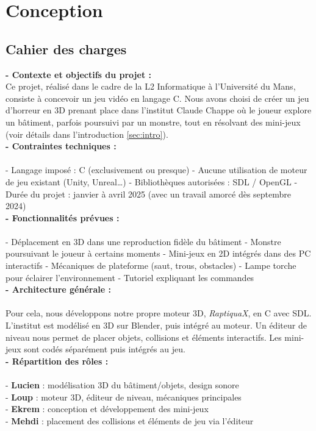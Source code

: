 \newpage
\section{Conception}

\subsection{Cahier des charges}

\textbf{- Contexte et objectifs du projet :}\\

Ce projet, réalisé dans le cadre de la L2 Informatique à l’Université du Mans,
consiste à concevoir un jeu vidéo en langage C. Nous avons choisi de créer un jeu
d’horreur en 3D prenant place dans l’institut Claude Chappe où le joueur explore un
bâtiment, parfois poursuivi par un monstre, tout en résolvant des mini-jeux (voir
détails dans l'introduction \ref{sec:intro}).\\

\textbf{- Contraintes techniques :}\\\\
- Langage imposé : C (exclusivement ou presque)  
- Aucune utilisation de moteur de jeu existant (Unity, Unreal…)  
- Bibliothèques autorisées : SDL / OpenGL  
- Durée du projet : janvier à avril 2025 (avec un travail amorcé dès septembre 2024)\\

\textbf{- Fonctionnalités prévues :}\\\\
- Déplacement en 3D dans une reproduction fidèle du bâtiment  
- Monstre poursuivant le joueur à certains moments  
- Mini-jeux en 2D intégrés dans des PC interactifs  
- Mécaniques de plateforme (saut, trous, obstacles)  
- Lampe torche pour éclairer l’environnement  
- Tutoriel expliquant les commandes\\

\textbf{- Architecture générale :}\\\\
Pour cela, nous développons notre propre moteur 3D, \textit{RaptiquaX}, en C avec SDL.
L’institut est modélisé en 3D sur Blender, puis intégré au moteur. Un éditeur de niveau
nous permet de placer objets, collisions et éléments interactifs. Les mini-jeux sont
codés séparément puis intégrés au jeu.\\

\textbf{- Répartition des rôles :}\\\\
- \textbf{Lucien} : modélisation 3D du bâtiment/objets, design sonore\\ 
- \textbf{Loup} : moteur 3D, éditeur de niveau, mécaniques principales\\  
- \textbf{Ekrem} : conception et développement des mini-jeux  \\
- \textbf{Mehdi} : placement des collisions et éléments de jeu via l’éditeur\\


